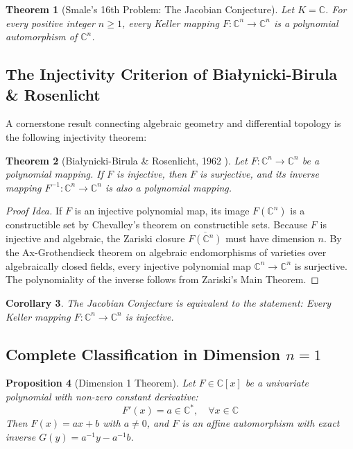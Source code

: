 \documentclass[11pt,a4paper]{article}
\newtheorem{theorem}{Theorem}[section]
\newtheorem{proposition}[theorem]{Proposition}
\newtheorem{corollary}[theorem]{Corollary}
\theoremstyle{definition}
\begin{document}
\begin{theorem}[Smale's 16th Problem: The Jacobian Conjecture]\label{thm:jacobian_conjecture}
Let $K = \mathbb{C}$. For every positive integer $n \ge 1$, every Keller mapping $F: \mathbb{C}^n \to \mathbb{C}^n$ is a polynomial automorphism of $\mathbb{C}^n$.
\end{theorem}

\subsection{The Injectivity Criterion of Bia\l ynicki-Birula \& Rosenlicht}
A cornerstone result connecting algebraic geometry and differential topology is the following injectivity theorem:

\begin{theorem}[Bia\l ynicki-Birula \& Rosenlicht, 1962 \cite{bbr1962}]\label{thm:bbr}
Let $F: \mathbb{C}^n \to \mathbb{C}^n$ be a polynomial mapping. If $F$ is injective, then $F$ is surjective, and its inverse mapping $F^{-1}: \mathbb{C}^n \to \mathbb{C}^n$ is also a polynomial mapping.
\end{theorem}

\begin{proof}[Proof Idea]
If $F$ is an injective polynomial map, its image $F(\mathbb{C}^n)$ is a constructible set by Chevalley's theorem on constructible sets. Because $F$ is injective and algebraic, the Zariski closure $\overline{F(\mathbb{C}^n)}$ must have dimension $n$. By the Ax-Grothendieck theorem on algebraic endomorphisms of varieties over algebraically closed fields, every injective polynomial map $\mathbb{C}^n \to \mathbb{C}^n$ is surjective. The polynomiality of the inverse follows from Zariski's Main Theorem.
\end{proof}

\begin{corollary}\label{cor:jc_injectivity}
The Jacobian Conjecture is equivalent to the statement: Every Keller mapping $F: \mathbb{C}^n \to \mathbb{C}^n$ is injective.
\end{corollary}

\subsection{Complete Classification in Dimension $n = 1$}

\begin{proposition}[Dimension 1 Theorem]\label{prop:dim_1}
Let $F \in \mathbb{C}[x]$ be a univariate polynomial with non-zero constant derivative:
\[ F'(x) = a \in \mathbb{C}^*, \quad \forall x \in \mathbb{C} \]
Then $F(x) = ax + b$ with $a \ne 0$, and $F$ is an affine automorphism with exact inverse $G(y) = a^{-1}y - a^{-1}b$.
\end{proposition}
\end{document}
